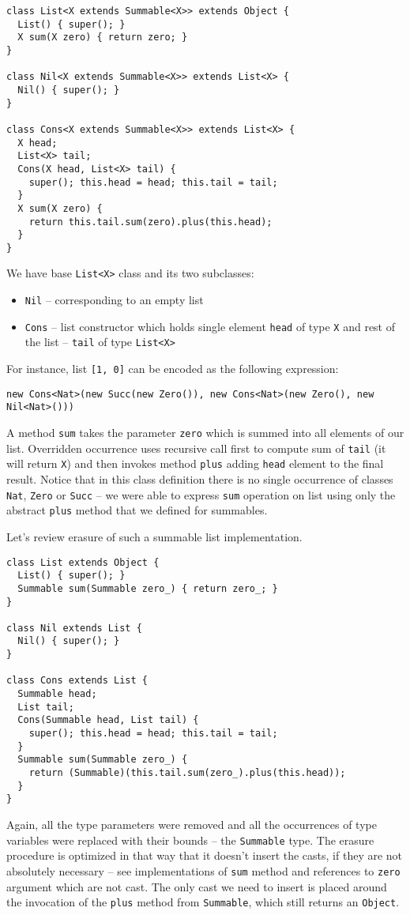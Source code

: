 \documentclass{article}[12pt]
\begin{document}
\begin{verbatim}
class List<X extends Summable<X>> extends Object {
  List() { super(); }
  X sum(X zero) { return zero; }
}

class Nil<X extends Summable<X>> extends List<X> {
  Nil() { super(); }
}

class Cons<X extends Summable<X>> extends List<X> {
  X head;
  List<X> tail;
  Cons(X head, List<X> tail) {
    super(); this.head = head; this.tail = tail;
  }
  X sum(X zero) {
    return this.tail.sum(zero).plus(this.head);
  }
}
\end{verbatim}
We have base \texttt{List<X>} class and its two subclasses:
\begin{itemize}
\item \texttt{Nil} -- corresponding to an empty list
\item \texttt{Cons} -- list constructor which holds single
  element \texttt{head} of type \texttt{X} and rest of the list
   -- \texttt{tail} of type \texttt{List<X>}
\end{itemize}
For instance, list \texttt{[1, 0]} can be encoded as
the following expression:

\begin{verbatim}
new Cons<Nat>(new Succ(new Zero()), new Cons<Nat>(new Zero(), new Nil<Nat>()))
\end{verbatim}
A method \texttt{sum} takes the parameter \texttt{zero} which is
summed into all elements of our list. Overridden occurrence
uses recursive call first to compute sum of \texttt{tail} (it will
return \texttt{X}) and then invokes method \texttt{plus} adding
\texttt{head} element to the final result. Notice that in this
class definition there is no single occurrence of classes \texttt{Nat},
\texttt{Zero} or \texttt{Succ} -- we were able to express
\texttt{sum} operation on list using only the abstract \texttt{plus}
method that we defined for summables.

Let's review erasure of such a summable list implementation.

\begin{verbatim}
class List extends Object {
  List() { super(); }
  Summable sum(Summable zero_) { return zero_; }
}

class Nil extends List {
  Nil() { super(); }
}

class Cons extends List {
  Summable head;
  List tail;
  Cons(Summable head, List tail) {
    super(); this.head = head; this.tail = tail;
  }
  Summable sum(Summable zero_) {
    return (Summable)(this.tail.sum(zero_).plus(this.head));
  }
}
\end{verbatim}
Again, all the type parameters were removed and all the occurrences
of type variables were replaced with their bounds -- the 
\texttt{Summable} type. The erasure procedure is
optimized in that way that it doesn't insert the casts, if they are
not absolutely necessary -- see implementations of \texttt{sum} method
and references to \texttt{zero} argument which are not cast.
The only cast we need to insert is placed around the invocation of 
the \texttt{plus} method from \texttt{Summable}, which still returns
an \texttt{Object}.
\end{document}
